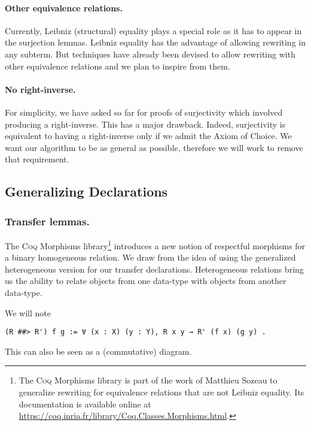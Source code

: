 \documentclass{llncs}
\begin{document}
\paragraph{Other equivalence relations.}
Currently, Leibniz (structural) equality plays a special role as it has to appear
in the surjection lemmas. Leibniz equality has the advantage of allowing rewriting in any
subterm. But techniques have already been devised \cite{Sozeau2010}
to allow rewriting with other equivalence
relations and we plan to inspire from them.

\paragraph{No right-inverse.}
For simplicity, we have asked so far
for proofs of surjectivity which involved
producing a right-inverse. This has a major drawback. Indeed,
surjectivity is equivalent to having a right-inverse only
if we admit the Axiom of Choice.
We want our algorithm to be as general as possible,
therefore we will work to remove that requirement.

\subsection{Generalizing Declarations}

\label{subsec:gen_decl}

\subsubsection{Transfer lemmas.}

The \textsc{Coq} Morphisms library\footnote{The \textsc{Coq} Morphisms library is part of the work
of Matthieu Sozeau \cite{Sozeau2010}
to generalize rewriting for equivalence relations that are not Leibniz equality.
Its documentation is available online at \url{https://coq.inria.fr/library/Coq.Classes.Morphisms.html}.}
introduces a new notion of respectful morphisms for a binary homogeneous relation.
We draw from \cite{Cohen2013} the idea of using the generalized heterogeneous version for our transfer
declarations.
Heterogeneous relations bring us the ability to relate objects from one data-type with
objects from another data-type.

We will note
\begin{verbatim}
(R ##> R') f g := ∀ (x : X) (y : Y), R x y → R' (f x) (g y) .\end{verbatim}
This can also be seen as a (commutative) diagram.
\end{document}
